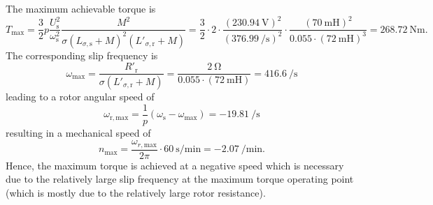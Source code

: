 
\begin{solutionblock}
    The maximum achievable torque is 
    $$ T_\mathrm{max} = \frac{3}{2} p \frac{U_\mathrm{s}^2}{\omega_\mathrm{s}^2}\frac{M^2}{\sigma (L_{\sigma,\mathrm{s}} +M)^2(L'_{\sigma,\mathrm{r}} +M)} = \frac{3}{2} \cdot2 \cdot \frac{(\SI{230.94}{\volt})^2}{(\SI{376.99}{\per\second})^2} \cdot\frac{(\SI{70}{\milli\henry})^2}{0.055\cdot(\SI{72}{\milli\henry})^3} = \SI{268.72}{\newton\metre}.$$
    The corresponding slip frequency is
    $$ \omega_{\mathrm{max}} = \frac{R'_\mathrm{r}}{\sigma (L'_{\sigma,\mathrm{r}} +M)} = \frac{\SI{2}{\ohm}}{0.055\cdot(\SI{72}{\milli\henry})} = \SI{416.6}{\per\second}$$
    leading to a rotor angular speed of
    $$ \omega_{\mathrm{r,max}} = \frac{1}{p} (\omega_\mathrm{s} - \omega_{\mathrm{max}}) = \SI{-19.81}{\per\second}$$
    resulting in a mechanical speed of
    $$ n_{\mathrm{max}} = \frac{\omega_{r,\mathrm{max}}}{2\pi} \cdot \SI{60}{\second\per\minute} = \SI{-2.07}{\per\minute}.$$
    Hence, the maximum torque is achieved at a negative speed which is necessary due to the relatively large slip frequency at the maximum torque operating point (which is mostly due to the relatively large rotor resistance).
\end{solutionblock}
